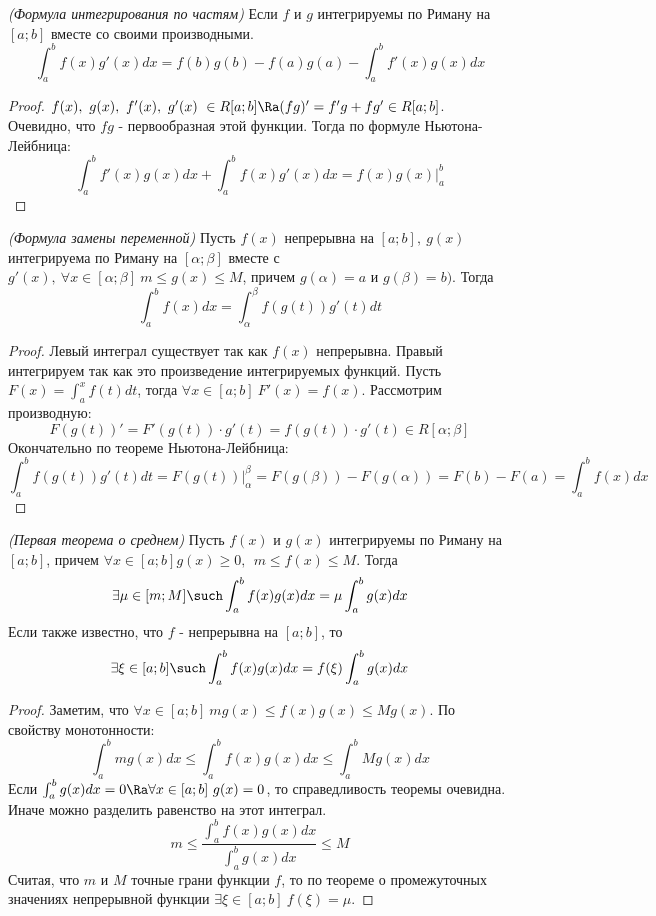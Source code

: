 \begin{corollary} \textit{(Формула интегрирования по частям)}
	Если $f$ и $g$ интегрируемы по Риману на $[a;b]$ вместе со своими производными.
	\[
		\int_a^bf(x)g'(x)dx = f(b)g(b) - f(a)g(a) - \int_a^bf'(x)g(x)dx
	\]
\end{corollary}

\begin{proof}
	$\\ f(x),\ g(x),\ f'(x),\ g'(x)\ \in R[a;b] \Ra (fg)'= f'g + fg' \in R[a;b]$.
	Очевидно, что $fg$ - первообразная этой функции. Тогда по формуле Ньютона-Лейбница:
	\[
		\int_a^bf'(x)g(x)dx + \int_a^bf(x)g'(x)dx = f(x)g(x)\Biggr |^b_a
	\]
\end{proof}

\begin{theorem} \textit{(Формула замены переменной)}
	Пусть $f(x)$ непрерывна на $[a;b],\ g(x)$ интегрируема по Риману на $[\alpha; \beta]$ вместе с $g'(x),\ \forall x \in [\alpha; \beta]\ m \leq g(x) \leq M$, причем $g(\alpha) = a\text{ и } g(\beta) = b)$. Тогда 
	\[
		\int_a^bf(x)dx = \int_\alpha^\beta f(g(t))g'(t)dt
	\]
\end{theorem}

\begin{proof}
	Левый интеграл существует так как $f(x)$ непрерывна. Правый интегрируем так как это произведение интегрируемых функций.
	Пусть $F(x) = \int_a^xf(t)dt$, тогда $\forall x \in [a;b]\ F'(x) = f(x)$.
	Рассмотрим производную:
	\[
		F(g(t))' = F'(g(t))\cdot g'(t) = f(g(t))\cdot g'(t) \in R[\alpha;\beta]
	\]
	Окончательно по теореме Ньютона-Лейбница:
	\[
		\int_a^bf(g(t))g'(t)dt = F(g(t)) \Biggr |_\alpha^\beta = F(g(\beta)) - F(g(\alpha))= F(b) - F(a) = \int_a^bf(x)dx
	\]
\end{proof}

\begin{theorem} \textit{(Первая теорема о среднем)}
	Пусть $f(x)$ и $g(x)$ интегрируемы по Риману на $[a;b]$, причем $\forall x\in [a;b] g(x) \geq 0,\ \ m \leq f(x) \leq M$. Тогда 
	\[
		\exists \mu \in [m;M] \such \int_a^bf(x)g(x)dx = \mu \int_a^bg(x)dx
	\]
	Если также известно, что $f$ - непрерывна на $[a;b]$, то 
	\[
		\exists \xi \in [a;b]\such \int_a^bf(x)g(x)dx = f(\xi)\int_a^bg(x)dx
	\]
\end{theorem}

\begin{proof}
	Заметим, что $\forall x\in [a;b]\ mg(x) \leq f(x)g(x) \leq Mg(x)$.
	По свойству монотонности:
	\[
		\int_a^bmg(x)dx \leq \int_a^bf(x)g(x)dx \leq \int_a^bMg(x)dx
	\]
	Если $\int_a^bg(x)dx = 0 \Ra \forall x \in [a;b]\ g(x) = 0$, то справедливость теоремы очевидна.
	Иначе можно разделить равенство на этот интеграл.
	\[
		m \leq \frac{\int_a^bf(x)g(x)dx}{\int_a^bg(x)dx} \leq M
	\]
	Считая, что $m$ и $M$ точные грани функции $f$, то по теореме о промежуточных значениях непрерывной функции $\exists \xi \in [a;b]\ f(\xi) = \mu$.
\end{proof}

